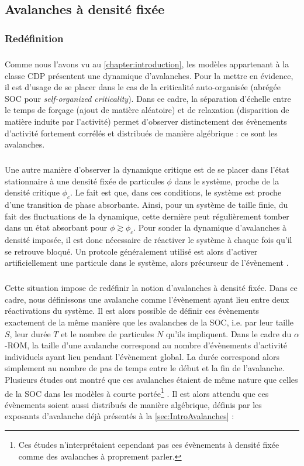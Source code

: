 \subsection{Avalanches à densité fixée}

\subsubsection{Redéfinition}

\subparagraph{}Comme nous l'avons vu au \autoref{chapter:introduction}, les modèles appartenant à la classe CDP présentent une dynamique d'avalanches. Pour la mettre en évidence, il est d'usage de se placer dans le cas de la criticalité auto-organisée (abrégée SOC pour \textit{self-organized criticality}). Dans ce cadre, la séparation d'échelle entre le temps de forçage (ajout de matière aléatoire) et de relaxation (disparition de matière induite par l'activité) permet d'observer distinctement des évènements d'activité fortement corrélés et distribués de manière algébrique : ce sont les avalanches.

\subparagraph{}Une autre manière d'observer la dynamique critique est de se placer dans l'état stationnaire à une densité fixée de particules $\phi$ dans le système, proche de la densité critique $\phi_c$. Le fait est que, dans ces conditions, le système est proche d'une transition de phase absorbante. Ainsi, pour un système de taille finie, du fait des fluctuations de la dynamique, cette dernière peut régulièrement tomber dans un état absorbant pour $\phi \gtrsim \phi_c$. Pour sonder la dynamique d'avalanches à densité imposée, il est donc nécessaire de réactiver le système à chaque fois qu'il se retrouve bloqué. Un protcole généralement utilisé est alors d'activer artificiellement une particule dans le système, alors précurseur de l'évènement \cite{lubeck_universal_2003, vespignani_absorbing_state_2000, munoz_avalanche_1999}.

\subparagraph{}Cette situation impose de redéfinir la notion d'avalanches à densité fixée. Dans ce cadre, nous définissons une avalanche comme l'évènement ayant lieu entre deux réactivations du système. Il est alors possible de définir ces évènements exactement de la même manière que les avalanches de la SOC, i.e. par leur taille $S$, leur durée $T$ et le nombre de particules $N$ qu'ils impliquent. Dans le cadre du $\alpha$-ROM, la taille d'une avalanche correspond au nombre d'évènements d'activité individuels ayant lieu pendant l'évènement global. La durée correspond alors simplement au nombre de pas de temps entre le début et la fin de l'avalanche. Plusieurs études ont montré que ces avalanches étaient de même nature que celles de la SOC dans les modèles à courte portée\footnote{Ces études n'interprétaient cependant pas ces évènements à densité fixée comme des avalanches à proprement parler.} \cite{lubeck_universal_2003, vespignani_absorbing_state_2000, munoz_avalanche_1999}. Il est alors attendu que ces évènements soient aussi distribués de manière algébrique, définis par les exposants d'avalanche déjà présentés à la \autoref{sec:IntroAvalanches} :

